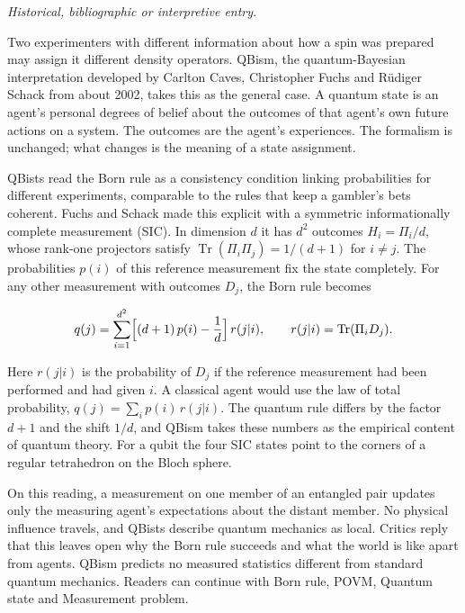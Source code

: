 \documentclass[11pt,oneside]{book}
\newenvironment{centeredalign}{\[\begin{gathered}[c]}{\end{gathered}\]}
\begin{document}
\label{topic:qbism}

\par\smallskip\noindent\textit{Historical, bibliographic or interpretive entry.}

Two experimenters with different information about how a spin was prepared may assign it different density operators. QBism, the quantum-Bayesian interpretation developed by Carlton Caves, Christopher Fuchs and Rüdiger Schack from about 2002, takes this as the general case. A quantum state is an agent's personal degrees of belief about the outcomes of that agent's own future actions on a system. The outcomes are the agent's experiences. The formalism is unchanged; what changes is the meaning of a state assignment.

QBists read the Born rule as a consistency condition linking probabilities for different experiments, comparable to the rules that keep a gambler's bets coherent. Fuchs and Schack made this explicit with a symmetric informationally complete measurement (SIC). In dimension \(d\) it has \(d^2\) outcomes \(H_i=\Pi_i/d\), whose rank-one projectors satisfy \(\operatorname{Tr}(\Pi_i\Pi_j)=1/(d+1)\) for \(i\neq j\). The probabilities \(p(i)\) of this reference measurement fix the state completely. For any other measurement with outcomes \(D_j\), the Born rule becomes

\begin{centeredalign}
q(j)=\sum_{i=1}^{d^2}\Bigl[(d+1)\,p(i)-\frac1d\Bigr]\,r(j|i),\qquad
r(j|i)=\operatorname{Tr}(\Pi_iD_j) .
\end{centeredalign}

Here \(r(j|i)\) is the probability of \(D_j\) if the reference measurement had been performed and had given \(i\). A classical agent would use the law of total probability, \(q(j)=\sum_ip(i)\,r(j|i)\). The quantum rule differs by the factor \(d+1\) and the shift \(1/d\), and QBism takes these numbers as the empirical content of quantum theory. For a qubit the four SIC states point to the corners of a regular tetrahedron on the Bloch sphere.

On this reading, a measurement on one member of an entangled pair updates only the measuring agent's expectations about the distant member. No physical influence travels, and QBists describe quantum mechanics as local. Critics reply that this leaves open why the Born rule succeeds and what the world is like apart from agents. QBism predicts no measured statistics different from standard quantum mechanics. Readers can continue with Born rule, POVM, Quantum state and Measurement problem.
\end{document}
